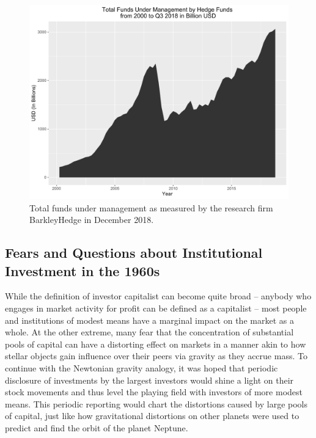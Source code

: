 \begin{figure}[ht]
	\centering
	\includegraphics[width=1\textwidth]{Figures/ChapterII/Hedge_Funds_Under_Management_Barkley_Hedge.pdf}
	\caption[Funds Under Management for Hedge Funds from 2000 to Q3 2018]{Total funds under management as measured by the research firm BarkleyHedge in December 2018.}
	\label{fig:hedgefundsundermanagementbarkleyhedge}
\end{figure}
		

\nocite{BarclayHedge2018}
	

	
\subsection{Fears and Questions about Institutional Investment in the 1960s}
	
While the definition of investor capitalist can become quite broad -- anybody who engages in market activity for profit can be defined as a capitalist -- most people and institutions of modest means have a marginal impact on the market as a whole. At the other extreme, many fear that the concentration of substantial pools of capital can have a distorting effect on markets in a manner akin to how stellar objects gain influence over their peers via gravity as they accrue mass. To continue with the Newtonian gravity analogy, it was hoped that periodic disclosure of investments by the largest investors would shine a light on their stock movements and thus level the playing field with investors of more modest means. This periodic reporting would chart the distortions caused by large pools of capital, just like how gravitational distortions on other planets were used to predict and find the orbit of the planet Neptune. 
	
